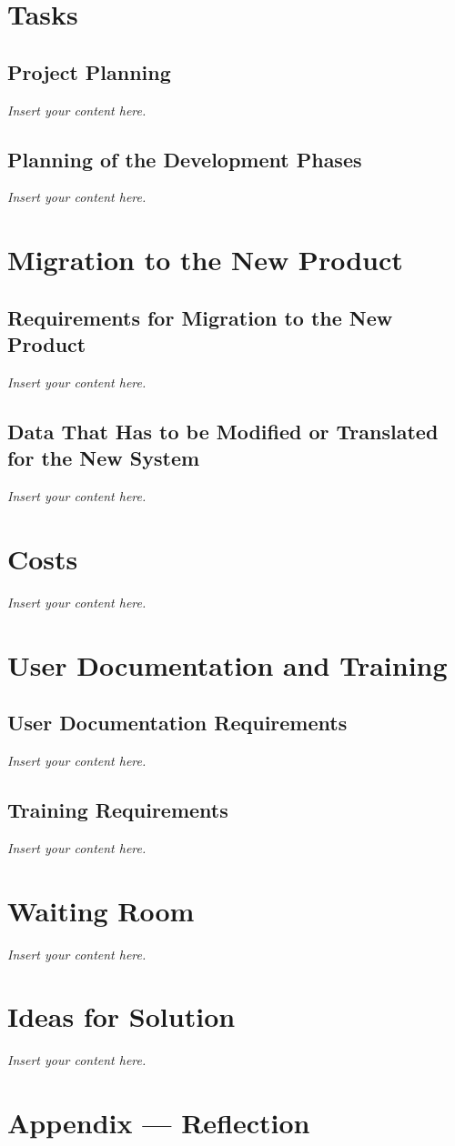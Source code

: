\documentclass[12pt]{article}
\newcommand{\lips}{\textit{Insert your content here.}}
\begin{document}
\section{Tasks}
\subsection{Project Planning}
\lips
\subsection{Planning of the Development Phases}
\lips

\section{Migration to the New Product}
\subsection{Requirements for Migration to the New Product}
\lips
\subsection{Data That Has to be Modified or Translated for the New System}
\lips

\section{Costs}
\lips
\section{User Documentation and Training}
\subsection{User Documentation Requirements}
\lips
\subsection{Training Requirements}
\lips

\section{Waiting Room}
\lips

\section{Ideas for Solution}
\lips

\newpage{}
\section*{Appendix --- Reflection}




\end{document}
